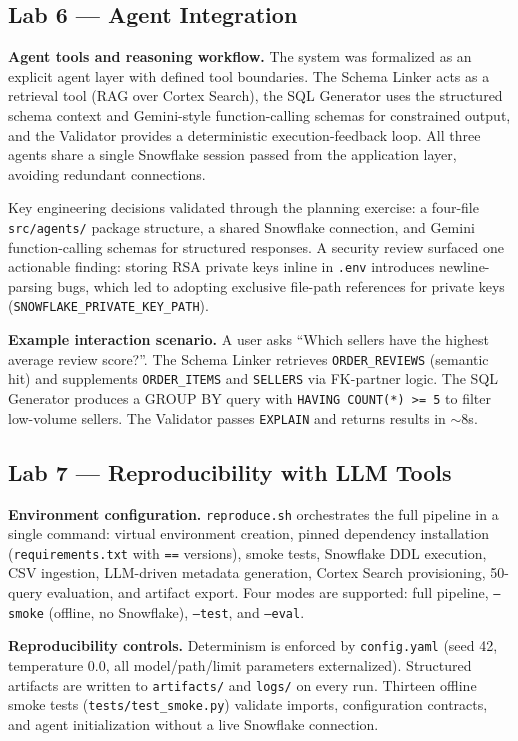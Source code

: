 \documentclass[11pt,letterpaper]{article}
\begin{document}
\subsection{Lab 6 --- Agent Integration}

\textbf{Agent tools and reasoning workflow.} The system was formalized as an explicit agent layer with defined tool boundaries. The Schema Linker acts as a retrieval tool (RAG over Cortex Search), the SQL Generator uses the structured schema context and Gemini-style function-calling schemas for constrained output, and the Validator provides a deterministic execution-feedback loop. All three agents share a single Snowflake session passed from the application layer, avoiding redundant connections.

Key engineering decisions validated through the planning exercise: a four-file \texttt{src/agents/} package structure, a shared Snowflake connection, and Gemini function-calling schemas for structured responses. A security review surfaced one actionable finding: storing RSA private keys inline in \texttt{.env} introduces newline-parsing bugs, which led to adopting exclusive file-path references for private keys (\texttt{SNOWFLAKE\_PRIVATE\_KEY\_PATH}).

\textbf{Example interaction scenario.} A user asks ``Which sellers have the highest average review score?''. The Schema Linker retrieves \texttt{ORDER\_REVIEWS} (semantic hit) and supplements \texttt{ORDER\_ITEMS} and \texttt{SELLERS} via FK-partner logic. The SQL Generator produces a GROUP BY query with \texttt{HAVING COUNT(*) >= 5} to filter low-volume sellers. The Validator passes \texttt{EXPLAIN} and returns results in $\sim$8s.

\subsection{Lab 7 --- Reproducibility with LLM Tools}

\textbf{Environment configuration.} \texttt{reproduce.sh} orchestrates the full pipeline in a single command: virtual environment creation, pinned dependency installation (\texttt{requirements.txt} with \texttt{==} versions), smoke tests, Snowflake DDL execution, CSV ingestion, LLM-driven metadata generation, Cortex Search provisioning, 50-query evaluation, and artifact export. Four modes are supported: full pipeline, \texttt{--smoke} (offline, no Snowflake), \texttt{--test}, and \texttt{--eval}.

\textbf{Reproducibility controls.} Determinism is enforced by \texttt{config.yaml} (seed 42, temperature 0.0, all model/path/limit parameters externalized). Structured artifacts are written to \texttt{artifacts/} and \texttt{logs/} on every run. Thirteen offline smoke tests (\texttt{tests/test\_smoke.py}) validate imports, configuration contracts, and agent initialization without a live Snowflake connection.
\end{document}
